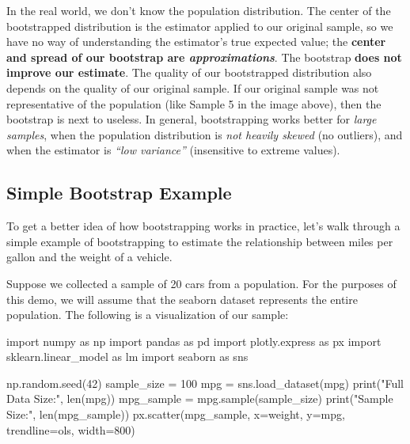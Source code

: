 \documentclass[
  letterpaper,
  DIV=11,
  numbers=noendperiod]{scrreprt}
\newenvironment{Shaded}{\begin{snugshade}}{\end{snugshade}}
\newcommand{\BuiltInTok}[1]{\textcolor[rgb]{0.00,0.23,0.31}{#1}}
\newcommand{\DecValTok}[1]{\textcolor[rgb]{0.68,0.00,0.00}{#1}}
\newcommand{\ImportTok}[1]{\textcolor[rgb]{0.00,0.46,0.62}{#1}}
\newcommand{\NormalTok}[1]{\textcolor[rgb]{0.00,0.23,0.31}{#1}}
\newcommand{\OperatorTok}[1]{\textcolor[rgb]{0.37,0.37,0.37}{#1}}
\newcommand{\StringTok}[1]{\textcolor[rgb]{0.13,0.47,0.30}{#1}}
\begin{document}
In the real world, we don't know the population distribution. The center
of the bootstrapped distribution is the estimator applied to our
original sample, so we have no way of understanding the estimator's true
expected value; the \textbf{center and spread of our bootstrap are
\emph{approximations}}. The bootstrap \textbf{does not improve our
estimate}. The quality of our bootstrapped distribution also depends on
the quality of our original sample. If our original sample was not
representative of the population (like Sample 5 in the image above),
then the bootstrap is next to useless. In general, bootstrapping works
better for \emph{large samples}, when the population distribution is
\emph{not heavily skewed} (no outliers), and when the estimator is
\emph{``low variance''} (insensitive to extreme values).

\subsection{Simple Bootstrap Example}\label{simple-bootstrap-example}

To get a better idea of how bootstrapping works in practice, let's walk
through a simple example of bootstrapping to estimate the relationship
between miles per gallon and the weight of a vehicle.

Suppose we collected a sample of 20 cars from a population. For the
purposes of this demo, we will assume that the seaborn dataset
represents the entire population. The following is a visualization of
our sample:

\begin{Shaded}
\begin{Highlighting}[]
\ImportTok{import}\NormalTok{ numpy }\ImportTok{as}\NormalTok{ np}
\ImportTok{import}\NormalTok{ pandas }\ImportTok{as}\NormalTok{ pd}
\ImportTok{import}\NormalTok{ plotly.express }\ImportTok{as}\NormalTok{ px}
\ImportTok{import}\NormalTok{ sklearn.linear\_model }\ImportTok{as}\NormalTok{ lm}
\ImportTok{import}\NormalTok{ seaborn }\ImportTok{as}\NormalTok{ sns}

\NormalTok{np.random.seed(}\DecValTok{42}\NormalTok{)}
\NormalTok{sample\_size }\OperatorTok{=} \DecValTok{100}
\NormalTok{mpg }\OperatorTok{=}\NormalTok{ sns.load\_dataset(}\StringTok{\textquotesingle{}mpg\textquotesingle{}}\NormalTok{)}
\BuiltInTok{print}\NormalTok{(}\StringTok{"Full Data Size:"}\NormalTok{, }\BuiltInTok{len}\NormalTok{(mpg))}
\NormalTok{mpg\_sample }\OperatorTok{=}\NormalTok{ mpg.sample(sample\_size)}
\BuiltInTok{print}\NormalTok{(}\StringTok{"Sample Size:"}\NormalTok{, }\BuiltInTok{len}\NormalTok{(mpg\_sample))}
\NormalTok{px.scatter(mpg\_sample, x}\OperatorTok{=}\StringTok{\textquotesingle{}weight\textquotesingle{}}\NormalTok{, y}\OperatorTok{=}\StringTok{\textquotesingle{}mpg\textquotesingle{}}\NormalTok{, trendline}\OperatorTok{=}\StringTok{\textquotesingle{}ols\textquotesingle{}}\NormalTok{, width}\OperatorTok{=}\DecValTok{800}\NormalTok{)}
\end{Highlighting}
\end{Shaded}
\end{document}
